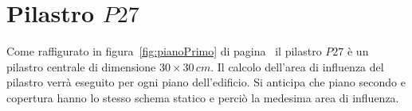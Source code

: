 \section{Pilastro $P27$}\label{sec:p27}

Come raffigurato in figura~\ref{fig:pianoPrimo} di pagina~\pageref{fig:pianoPrimo} il pilastro $P27$ è un pilastro centrale di dimensione $30\times 30\,cm$. Il calcolo dell'area di influenza del pilastro verrà eseguito per ogni piano dell'edificio. Si anticipa che piano secondo e copertura hanno lo stesso schema statico e perciò la medesima area di influenza.
